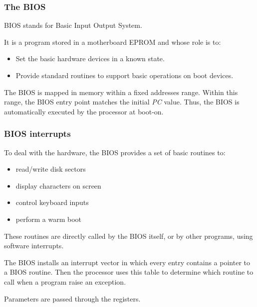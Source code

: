 \begin{frame}
  \frametitle{The BIOS}

  BIOS stands for Basic Input Output System.

  \-

  It is a program stored in a motherboard EPROM and whose role is to:
  \begin{itemize}
  \item Set the basic hardware devices in a known state.
  \item Provide standard routines to support basic operations on boot devices.
  \end{itemize}

  \-

  The BIOS is mapped in memory within a fixed addresses range. Within this range, the BIOS entry point matches the initial {\em PC} value. Thus, the BIOS is automatically executed by the processor at boot-on.

\end{frame}

%
%
%

\begin{frame}
  \frametitle{BIOS interrupts}

  To deal with the hardware, the BIOS provides a set of basic routines to:

  \begin{itemize}
  \item read/write disk sectors
  \item display characters on screen
  \item control keyboard inputs
  \item perform a warm boot
  \end{itemize}

  \-

  These routines are directly called by the BIOS itself, or by other programs, using software interrupts.

  \-

  The BIOS installs an interrupt vector in which every entry contains a pointer to a BIOS routine. Then the processor uses this table to determine which routine to call when a program raise an exception.

  \-

  Parameters are passed through the registers.

\end{frame}

%
%
%

